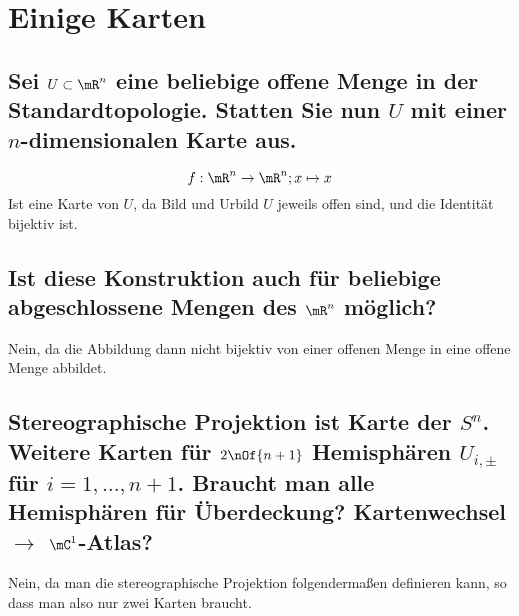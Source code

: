 \section{Einige Karten}

\subsection{Sei $U \subset \mR^n$ eine beliebige offene Menge in der Standardtopologie. Statten Sie nun $U$ mit einer $n$-dimensionalen Karte aus.}
\begin{equation}
	f : \mR^n \to \mR^n; x \mapsto x
\end{equation}
Ist eine Karte von $U$, da Bild und Urbild $U$ jeweils offen sind, und die Identität bijektiv ist.

\subsection{Ist diese Konstruktion auch für beliebige abgeschlossene Mengen des $\mR^n$ möglich?}
Nein, da die Abbildung dann nicht bijektiv von einer offenen Menge in eine offene Menge abbildet.

\subsection{Stereographische Projektion ist Karte der $S^n$. Weitere Karten für $2\nOf{n+1}$ Hemisphären $U_{i,\pm}$ für $i = 1,\dots,n+1$. Braucht man alle Hemisphären für Überdeckung? Kartenwechsel $\rightarrow$ $\mC^1$-Atlas?}
Nein, da man die stereographische Projektion folgendermaßen definieren kann, so dass man also nur zwei Karten braucht.
